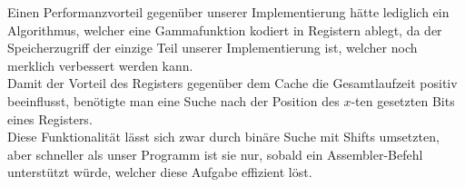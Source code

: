 \documentclass[course=erap]{aspdoc}
\begin{document}
	\noindent Einen Performanzvorteil gegenüber unserer Implementierung hätte lediglich ein Algorithmus, welcher eine Gammafunktion kodiert in Registern ablegt, da der Speicherzugriff der einzige Teil unserer Implementierung ist, welcher noch merklich verbessert werden kann.\\
	Damit der Vorteil des Registers gegenüber dem Cache die Gesamtlaufzeit positiv beeinflusst, benötigte man eine Suche nach der Position des $x$-ten gesetzten Bits eines Registers.\\
	Diese Funktionalität lässt sich zwar durch binäre Suche mit Shifts umsetzten, aber schneller als unser Programm ist sie nur, sobald ein Assembler-Befehl unterstützt würde, welcher diese Aufgabe effizient löst.

	
	{}
	\printbibliography
\end{document}
